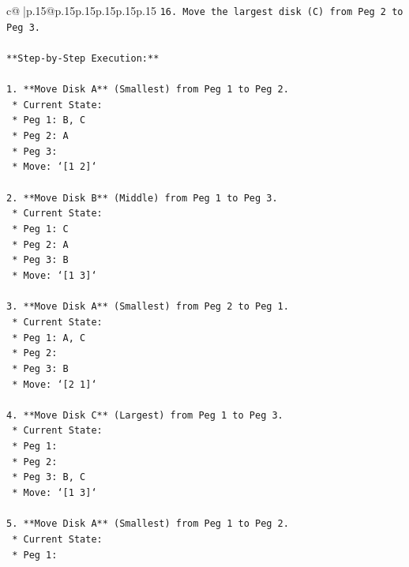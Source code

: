 \documentclass{article}
\begin{document}
{\begin{supertabular}{c@{$\;$}|p{.15\linewidth}@{}p{.15\linewidth}p{.15\linewidth}p{.15\linewidth}p{.15\linewidth}p{.15\linewidth}}
{{{\texttt{16. Move the largest disk (C) from Peg 2 to Peg 3.} \\
\\ 
\texttt{**Step{-}by{-}Step Execution:**} \\
\\ 
\texttt{1.  **Move Disk A** (Smallest) from Peg 1 to Peg 2.} \\
\texttt{    *   Current State:} \\
\texttt{        *   Peg 1: B, C} \\
\texttt{        *   Peg 2: A} \\
\texttt{        *   Peg 3:} \\
\texttt{    *   Move: `{[}1 2{]}`} \\
\\ 
\texttt{2.  **Move Disk B** (Middle) from Peg 1 to Peg 3.} \\
\texttt{    *   Current State:} \\
\texttt{        *   Peg 1: C} \\
\texttt{        *   Peg 2: A} \\
\texttt{        *   Peg 3: B} \\
\texttt{    *   Move: `{[}1 3{]}`} \\
\\ 
\texttt{3.  **Move Disk A** (Smallest) from Peg 2 to Peg 1.} \\
\texttt{    *   Current State:} \\
\texttt{        *   Peg 1: A, C} \\
\texttt{        *   Peg 2:} \\
\texttt{        *   Peg 3: B} \\
\texttt{    *   Move: `{[}2 1{]}`} \\
\\ 
\texttt{4.  **Move Disk C** (Largest) from Peg 1 to Peg 3.} \\
\texttt{    *   Current State:} \\
\texttt{        *   Peg 1:} \\
\texttt{        *   Peg 2:} \\
\texttt{        *   Peg 3: B, C} \\
\texttt{    *   Move: `{[}1 3{]}`} \\
\\ 
\texttt{5.  **Move Disk A** (Smallest) from Peg 1 to Peg 2.} \\
\texttt{    *   Current State:} \\
\texttt{        *   Peg 1:} \\
}}}
\end{supertabular}}
\end{document}
